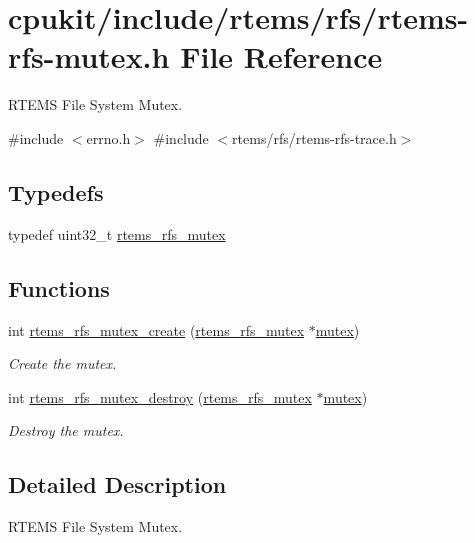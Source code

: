\hypertarget{rtems-rfs-mutex_8h}{}\section{cpukit/include/rtems/rfs/rtems-\/rfs-\/mutex.h File Reference}
\label{rtems-rfs-mutex_8h}


R\+T\+E\+MS File System Mutex.  


{\ttfamily \#include $<$errno.\+h$>$}\newline
{\ttfamily \#include $<$rtems/rfs/rtems-\/rfs-\/trace.\+h$>$}\newline
\subsection*{Typedefs}
\begin{DoxyCompactItemize}
\item 
typedef uint32\+\_\+t \mbox{\hyperlink{rtems-rfs-mutex_8h_a5234b0b9f6a152769b4f405b76461a19}{rtems\+\_\+rfs\+\_\+mutex}}
\end{DoxyCompactItemize}
\subsection*{Functions}
\begin{DoxyCompactItemize}
\item 
int \mbox{\hyperlink{rtems-rfs-mutex_8h_a4f5527fa74478729e066bbd75bca7bd6}{rtems\+\_\+rfs\+\_\+mutex\+\_\+create}} (\mbox{\hyperlink{rtems-rfs-mutex_8h_a5234b0b9f6a152769b4f405b76461a19}{rtems\+\_\+rfs\+\_\+mutex}} $\ast$\mbox{\hyperlink{structmutex}{mutex}})
\begin{DoxyCompactList}\small\item\em Create the mutex. \end{DoxyCompactList}\item 
int \mbox{\hyperlink{rtems-rfs-mutex_8h_ac494069c1aa2132f8f63226dc0d20b4c}{rtems\+\_\+rfs\+\_\+mutex\+\_\+destroy}} (\mbox{\hyperlink{rtems-rfs-mutex_8h_a5234b0b9f6a152769b4f405b76461a19}{rtems\+\_\+rfs\+\_\+mutex}} $\ast$\mbox{\hyperlink{structmutex}{mutex}})
\begin{DoxyCompactList}\small\item\em Destroy the mutex. \end{DoxyCompactList}\end{DoxyCompactItemize}


\subsection{Detailed Description}
R\+T\+E\+MS File System Mutex. 


